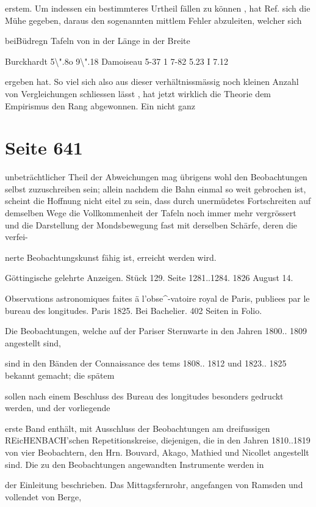 \documentclass[10pt,a4paper]{article}
\begin{document}
erstem. Um indessen ein bestimmteres Urtheil fällen zu können , hat Ref. sich die Mühe gegeben, daraus den sogenannten mittlem Fehler abzuleiten, welcher sich

beiBüdregn Tafeln von in der Länge in der Breite

Burckhardt 5\textbackslash{}".8o 9\textbackslash{}".18 Damoiseau 5-37 1 7-82 5.23 I 7.12

ergeben hat. So viel sich also aus dieser verhältnissmässig noch kleinen Anzahl von Vergleichungen schliessen lässt , hat jetzt wirklich die Theorie dem Empirismus den Rang abgewonnen. Ein nicht ganz


\newpage
\section*{Seite 641}
unbeträchtlicher Theil der Abweichungen mag übrigens wohl den Beobachtungen selbst zuzuschreiben sein; allein nachdem die Bahn einmal so weit gebrochen ist, scheint die Hoffnung nicht eitel zu sein, dass durch unermüdetes Fortschreiten auf demselben Wege die Vollkommenheit der Tafeln noch immer mehr vergrössert und die Darstellung der Mondsbewegung fast mit derselben Schärfe, deren die verfei-

nerte Beobachtungskunst fähig ist, erreicht werden wird.

Göttingische gelehrte Anzeigen. Stück 129. Seite 1281..1284. 1826 August 14.

Observations astronomiques faites ä l'obse\textasciicircum{}-vatoire royal de Paris, publiees par le bureau des longitudes. Paris 1825. Bei Bachelier. 402 Seiten in Folio.

Die Beobachtungen, welche auf der Pariser Sternwarte in den Jahren 1800.. 1809 angestellt sind,

sind in den Bänden der Connaissance des tems 1808.. 1812 und 1823.. 1825 bekannt gemacht; die spätem

sollen nach einem Beschluss des Bureau des longitudes besonders gedruckt werden, und der vorliegende

erste Band enthält, mit Ausschluss der Beobachtungen am dreifussigen REicHENBACH'schen Repetitionskreise, diejenigen, die in den Jahren 1810..1819 von vier Beobachtern, den Hrn. Bouvard, Akago, Mathied und Nicollet angestellt sind. Die zu den Beobachtungen angewandten Instrumente werden in

der Einleitung beschrieben. Das Mittagsfernrohr, angefangen von Ramsden und vollendet von Berge,
\end{document}
